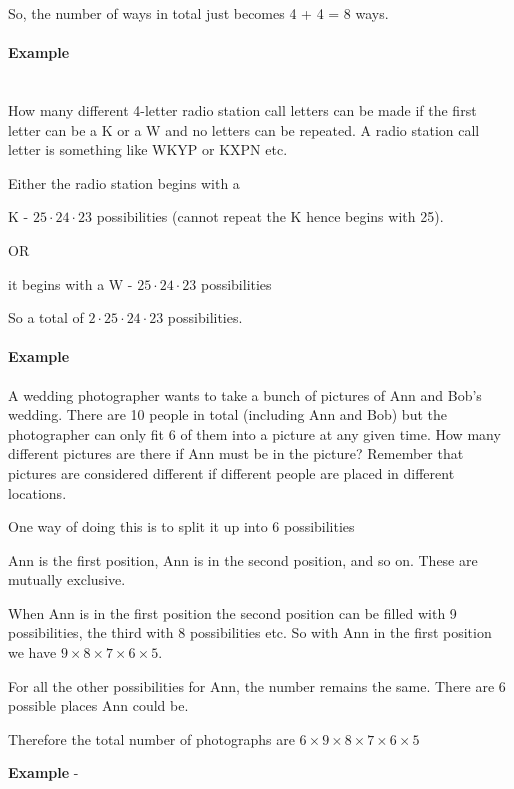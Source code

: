 \documentclass[12pt]{article}
\begin{document}
So, the number of ways in total just becomes 4 + 4 = 8 ways.

\paragraph{Example}~\\ 

How many different 4-letter radio station call letters can be made if the first letter can be a K or a W and no letters can be repeated. A radio station call letter is something like WKYP or KXPN etc.

Either the radio station begins with a 

K - $25 \cdot 24 \cdot 23$ possibilities (cannot repeat the K hence begins with 25).

OR

it begins with a W - $25 \cdot 24 \cdot 23$ possibilities

So a total of $2 \cdot 25 \cdot 24 \cdot 23$ possibilities.

\paragraph{Example}

A wedding photographer wants to take a  bunch of pictures of Ann and Bob's wedding. There are 10 people in total (including Ann and Bob) but the photographer can only fit 6 of them into a picture at any given time. How many different pictures are there if Ann must be in the picture? Remember that pictures are considered different if different people are placed in different locations.

\medskip

One way of doing this is to split it up into 6 possibilities

Ann is the first position, Ann is in the second position, and so on. These are mutually exclusive.

When Ann is in the first position the second position can be filled with 9 possibilities, the third with 8 possibilities etc. So with Ann in the first position we have 
$9 \times 8 \times 7 \times 6 \times 5$.

For all the other possibilities for Ann, the number remains the same. There are 6 possible places Ann could be. 

Therefore the total number of photographs are $6 \times 9 \times 8 \times 7 \times 6 \times 5$

\medskip

\textbf{Example} - 
\end{document}
